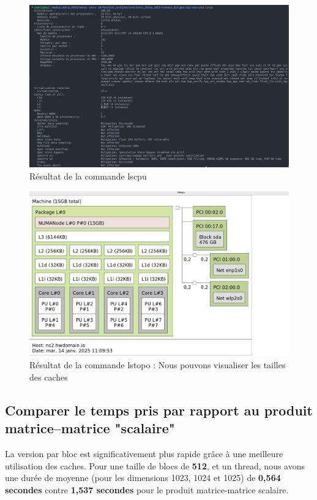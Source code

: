 \documentclass[a4paper,13pt]{book}
\begin{document}
\begin{figure}[!h]
    \begin{center}
    \includegraphics[scale=0.5]{images/lscpu.png}
    \caption{Résultat de la commande lscpu}
    \label{tab:lscpu}
\end{center}
\end{figure}


\begin{figure}[!h]
    \begin{center}
        \includegraphics[scale=0.3]{images/lstopo.png}
        \caption{Résultat de la commande lstopo : Nous pouvons visualiser les tailles des caches}
        \label{tab:ls_topo}
    \end{center}
\end{figure}
\clearpage
\subsection{Comparer le temps pris par rapport au produit matrice–matrice "scalaire"}
    La version par bloc est significativement plus rapide grâce à une meilleure utilisation des caches. Pour une taille de blocs de \textbf{512}, et un thread, nous avons une durée de moyenne (pour les dimensions 1023, 1024 et 1025) de \textbf{0,564 secondes}  contre \textbf{1,537 secondes} pour le produit matrice-matrice scalaire.
\end{document}
